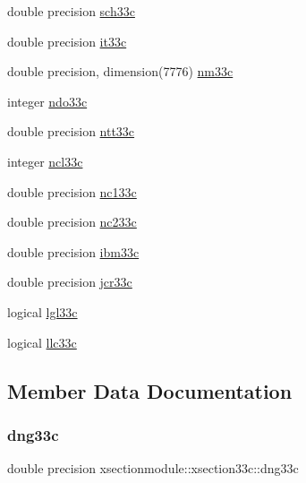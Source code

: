 \begin{DoxyCompactItemize}
\item 
double precision \hyperlink{structxsectionmodule_1_1xsection33c_a8f0b9c410446ce9d80a8716e34f3bc62}{sch33c}
\item 
double precision \hyperlink{structxsectionmodule_1_1xsection33c_a4d4f64c3ff5d6dbf8e8adb91149f01e5}{it33c}
\item 
double precision, dimension(7776) \hyperlink{structxsectionmodule_1_1xsection33c_a2aa6c5acdaabdf9e835db5b7f9268fad}{nm33c}
\item 
integer \hyperlink{structxsectionmodule_1_1xsection33c_a2598014bb441069ffa618b0d9ece1cf8}{ndo33c}
\item 
double precision \hyperlink{structxsectionmodule_1_1xsection33c_a14d9b27a644e55fb5ea97eeab271c289}{ntt33c}
\item 
integer \hyperlink{structxsectionmodule_1_1xsection33c_a0185c0de6c55d89926483296e6b51a70}{ncl33c}
\item 
double precision \hyperlink{structxsectionmodule_1_1xsection33c_ab0b72d2036bfafe53ada49db12e822a3}{nc133c}
\item 
double precision \hyperlink{structxsectionmodule_1_1xsection33c_a7890107dde6527f502af9431b17808a3}{nc233c}
\item 
double precision \hyperlink{structxsectionmodule_1_1xsection33c_a654c7ed0588ad7123ebdffda4639ecb0}{ibm33c}
\item 
double precision \hyperlink{structxsectionmodule_1_1xsection33c_a331442e66c6edba1ebce11dd05a78cb7}{jcr33c}
\item 
logical \hyperlink{structxsectionmodule_1_1xsection33c_a131f25540baa3cfbe6829b0ddedfe403}{lgl33c}
\item 
logical \hyperlink{structxsectionmodule_1_1xsection33c_ad414672d917dd3cf423b903ed76e672a}{llc33c}
\end{DoxyCompactItemize}


\subsection{Member Data Documentation}
\mbox{\label{structxsectionmodule_1_1xsection33c_a8d2ac3988d1c9012e7fddcb9c5e5c1e1}} 
\subsubsection{\texorpdfstring{dng33c}{dng33c}}
{\footnotesize\ttfamily double precision xsectionmodule\+::xsection33c\+::dng33c}


